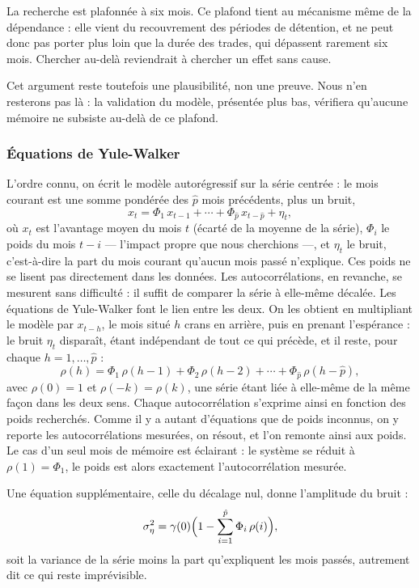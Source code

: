 La recherche est plafonnée à six mois. Ce plafond tient au mécanisme même de
la dépendance : elle vient du recouvrement des périodes de détention, et ne
peut donc pas porter plus loin que la durée des trades, qui dépassent
rarement six mois. Chercher au-delà reviendrait à chercher un effet sans
cause.

Cet argument reste toutefois une plausibilité, non une preuve. Nous n'en
resterons pas là : la validation du modèle, présentée plus bas, vérifiera
qu'aucune mémoire ne subsiste au-delà de ce plafond.

\subsubsection*{Équations de Yule-Walker}

L'ordre connu, on écrit le modèle autorégressif sur la série centrée : le
mois courant est une somme pondérée des \(\hat p\) mois précédents, plus un
bruit,
\[
  x_t = \Phi_1\, x_{t-1} + \cdots + \Phi_{\hat p}\, x_{t-\hat p} + \eta_t ,
\]
où \(x_t\) est l'avantage moyen du mois \(t\) (écarté de la moyenne de la
série), \(\Phi_i\) le poids du mois \(t-i\) — l'impact propre que nous
cherchions —, et \(\eta_t\) le bruit, c'est-à-dire la part du mois courant
qu'aucun mois passé n'explique.
Ces poids ne se lisent pas directement dans les données. Les autocorrélations,
en revanche, se mesurent sans difficulté : il suffit de comparer la série à
elle-même décalée. Les équations de Yule-Walker font le lien entre les deux.
On les obtient en multipliant le modèle par \(x_{t-h}\), le mois situé \(h\)
crans en arrière, puis en prenant l'espérance : le bruit \(\eta_t\) disparaît,
étant indépendant de tout ce qui précède, et il reste, pour chaque
\(h = 1, \ldots, \hat p\) :
\[
  \rho(h) = \Phi_1\,\rho(h-1) + \Phi_2\,\rho(h-2) + \cdots + \Phi_{\hat p}\,\rho(h-\hat p),
\]
avec \(\rho(0) = 1\) et \(\rho(-k) = \rho(k)\), une série étant liée à
elle-même de la même façon dans les deux sens. Chaque autocorrélation
s'exprime ainsi en fonction des poids recherchés. Comme il y a autant
d'équations que de poids inconnus, on y reporte les autocorrélations mesurées,
on résout, et l'on remonte ainsi aux poids. Le cas d'un seul mois de mémoire
est éclairant : le système se réduit à \(\rho(1) = \Phi_1\), le poids est
alors exactement l'autocorrélation mesurée.

Une équation supplémentaire, celle du décalage nul, donne l'amplitude du
bruit :
\[
  \sigma^2_\eta = \gamma(0)\Bigl(1 - \sum_{i=1}^{\hat p} \Phi_i\,\rho(i)\Bigr),
\]
soit la variance de la série moins la part qu'expliquent les mois passés,
autrement dit ce qui reste imprévisible.

